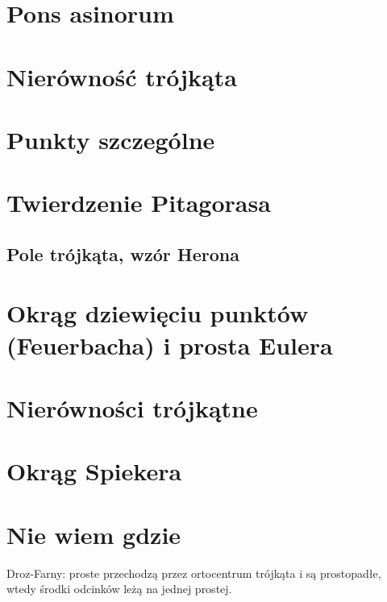 

\section{Pons asinorum}


\section{Nierówność trójkąta}


\section{Punkty szczególne}


\section{Twierdzenie Pitagorasa}


\subsection{Pole trójkąta, wzór Herona}


\section{Okrąg dziewięciu punktów (Feuerbacha) i prosta Eulera}


\section{Nierówności trójkątne}


\section{Okrąg Spiekera}


\section{Nie wiem gdzie}

Droz-Farny: proste przechodzą przez ortocentrum trójkąta i są prostopadłe, wtedy środki odcinków leżą na jednej prostej. %

